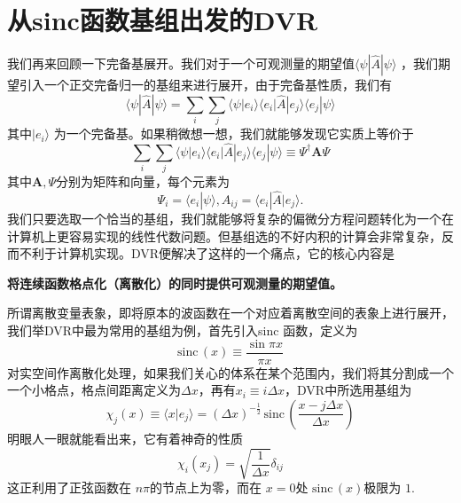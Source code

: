 \documentclass[12pt,a4paper,openany,twoside]{book}
\numberwithin{equation}{section}
\newcommand{\sinc}[1]{\mathrm{sinc} \, (#1)}
\begin{document}
      \section{从sinc函数基组出发的DVR}
        我们再来回顾一下完备基展开。我们对于一个可观测量的期望值$\langle \psi | \hat{A} | \psi \rangle $ ，我们期望引入一个正交完备归一的基组来进行展开，由于完备基性质，我们有
        \begin{equation}
      	  \langle \psi | \hat{A} | \psi \rangle = \sum_i \sum_j \langle \psi | e_i \rangle \langle e_i | \hat{A} | e_j \rangle \langle e_j | \psi \rangle 
        \end{equation}
        其中$| e_i \rangle $ 为一个完备基。如果稍微想一想，我们就能够发现它实质上等价于
        \begin{equation}
      	  \sum_i \sum_j \langle \psi | e_i \rangle \langle e_i | \hat{A} | e_j \rangle \langle e_j | \psi \rangle \equiv \Psi ^\dagger\mathbf{A} \Psi
        \end{equation}
        其中$\mathbf{A}, \Psi$分别为矩阵和向量，每个元素为
        \[
      	  \Psi_i = \langle e_i | \psi \rangle , A_{ij} = \langle e_i | \hat{A} | e_j \rangle 
        .\] 
        我们只要选取一个恰当的基组，我们就能够将复杂的偏微分方程问题转化为一个在计算机上更容易实现的线性代数问题。但基组选的不好内积的计算会非常复杂，反而不利于计算机实现。DVR便解决了这样的一个痛点，它的核心内容是
        \begin{center}
        	\textbf{将连续函数格点化（离散化）的同时提供可观测量的期望值。}
        \end{center}
        所谓离散变量表象，即将原本的波函数在一个对应着离散空间的表象上进行展开，我们举DVR中最为常用的基组为例，首先引入sinc 函数，定义为
        \begin{equation}
        	\mathrm{sinc} \, (x) \equiv \frac{\sin{\pi x}}{\pi x}  
        \end{equation}
        对实空间作离散化处理，如果我们关心的体系在某个范围内，我们将其分割成一个一个小格点，格点间距离定义为$\Delta x$，再有$x_i \equiv i\Delta x$，DVR中所选用基组为
        \begin{equation}
      	  \chi_j (x) \equiv \langle x | e_j \rangle = (\Delta x)^{-\frac{1}{2}}\, \sinc{\frac{x - j \Delta x}{\Delta x}} 
        \end{equation}
        明眼人一眼就能看出来，它有着神奇的性质
        \begin{equation}
        	\chi_i (x_j) = \sqrt{\frac{1}{\Delta x}} \delta_{ij}
        \end{equation}
        这正利用了正弦函数在 $n\pi$的节点上为零，而在 $x=0$处 $\sinc{x}$极限为 $1$.
\end{document}
